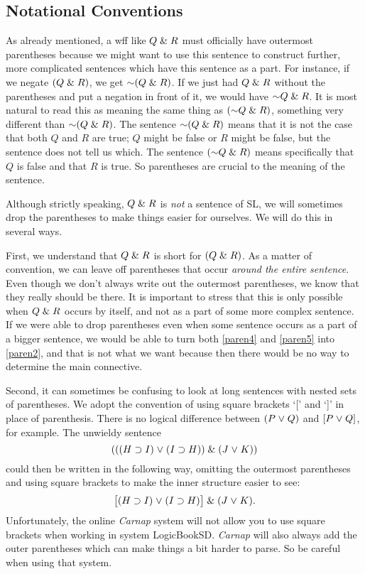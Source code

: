 \subsection{Notational Conventions}
\label{SLconventions}

As already mentioned, a wff like $Q \mathrel\& R$ must officially have outermost parentheses because we might want to use this sentence to construct further, more complicated sentences which have this sentence as a part. 
For instance, if we negate $(Q \mathrel\& R)$, we get $\enot(Q \eand R)$.
If we just had $Q \mathrel\& R$ without the parentheses and put a negation in front of it, we would have $\enot Q \eand R$.
It is most natural to read this as meaning the same thing as $(\enot Q \eand R)$, something very different than $\enot(Q\eand R)$.
The sentence $\enot(Q \eand R)$ means that it is not the case that both $Q$ and $R$ are true; $Q$ might be false or $R$ might be false, but the sentence does not tell us which.
The sentence $(\enot Q \eand R)$ means specifically that $Q$ is false and that $R$ is true.
So parentheses are crucial to the meaning of the sentence.

Although strictly speaking, $Q \mathrel\& R$ is \emph{not} a sentence of SL, we will sometimes drop the parentheses to make things easier for ourselves.
We will do this in several ways.

First, we understand that $Q \mathrel\& R$ is short for $(Q \mathrel\& R)$.
As a matter of convention, we can leave off parentheses that occur \emph{around the entire sentence}.
Even though we don't always write out the outermost parentheses, we know that they really should be there.
It is important to stress that this is only possible when $Q \mathrel\& R$ occurs by itself, and not as a part of some more complex sentence. 
If we were able to drop parentheses even when some sentence occurs as a part of a bigger sentence, we would be able to turn both \ref{paren4} and \ref{paren5} into \ref{paren2}, and that is not what we want because then there would be no way to determine the main connective.

Second, it can sometimes be confusing to look at long sentences with nested sets of parentheses.
We adopt the convention of using square brackets `[' and `]' in place of parenthesis.
There is no logical difference between $(P\mkern1mu\vee\mkern1mu Q)$ and $[P\mkern1mu\vee\mkern1mu Q]$, for example.
The unwieldy sentence
  $$(((H \supset I) \mkern1mu\vee\mkern1mu (I \supset H)) \mathrel\& (J \mkern1mu\vee\mkern1mu K))$$
could then be written in the following way, omitting the outermost parentheses and using square brackets to make the inner structure easier to see:
  $$\bigl[(H \supset I) \mkern1mu\vee\mkern1mu (I \supset H)\bigr] \mathrel\& (J \mkern1mu\vee\mkern1mu K).$$
Unfortunately, the online \textit{Carnap} system will not allow you to use square brackets when working in system LogicBookSD.
\textit{Carnap} will also always add the outer parentheses which can make things a bit harder to parse.
So be careful when using that system.

